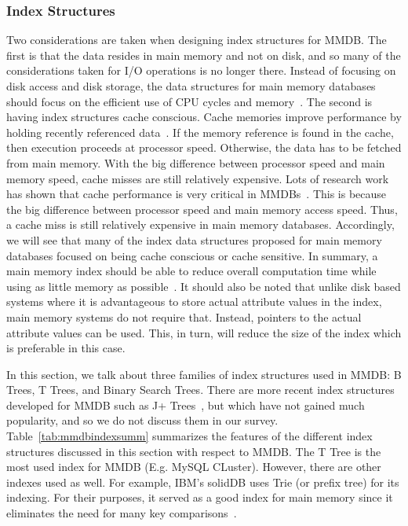 \documentclass[12pt,a4paper]{article}
\begin{document}
\subsubsection{Index Structures}

Two considerations are taken when designing index structures for MMDB. The first is that the data resides in main memory and not on disk, and so many of the
considerations taken for I/O operations is no longer there. Instead of focusing on disk access and disk storage, the data structures for main memory
databases should focus on the efficient use of CPU cycles and memory~\cite{lehman1986study}. The second is having index structures cache conscious. Cache
memories improve performance by holding recently referenced data~\cite{smith1982cache}. If the memory reference is found in the cache, then execution proceeds
at processor speed. Otherwise, the data has to be fetched from main memory. With the big difference between processor speed and main memory speed, cache misses
are still relatively expensive. Lots of research work has shown that cache performance is very critical in MMDBs~\cite{boncz1999database,rao1999cache}. This is
because the big difference between processor speed and main memory access speed. Thus, a cache miss is still relatively expensive in main memory databases.
Accordingly, we will see that many of the index data structures proposed for main memory databases focused on being cache conscious or cache sensitive. In
summary, a main memory index should be able to reduce overall computation time while using as little memory as possible~\cite{lehman1986study}. It should also
be noted that unlike disk based systems where it is advantageous to store actual attribute values in the index, main memory systems do not require that.
Instead, pointers to the actual attribute values can be used. This, in turn, will reduce the size of the index which is preferable in this case.

In this section, we talk about three families of index structures used in MMDB: B Trees, T Trees, and Binary Search Trees. There are more recent index
structures developed for MMDB such as J+ Trees~\cite{luan2009prefetching}, but which have not gained much popularity, and so we do not discuss them in our
survey. Table~\ref{tab:mmdbindexsumm} summarizes the features of the different index structures discussed in this section with respect to MMDB. The T Tree is
the most used index for MMDB (E.g. MySQL CLuster). However, there are other indexes used as well. For example, IBM's solidDB uses Trie (or prefix tree) for its
indexing. For their purposes, it served as a good index for main memory since it eliminates the need for many key comparisons~\cite{ibmsoliddb}.
\end{document}
